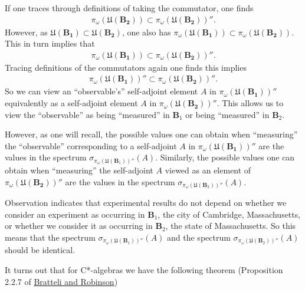 If one traces through definitions of taking the commutator, one finds
\begin{align}
    \pi_{\omega}(\mathfrak{U}(\mathbf{B_2})) \subset \pi_{\omega}(\mathfrak{U}(\mathbf{B_2}))''.
\end{align}
However, as $\mathfrak{U}(\mathbf{B_1}) \subset \mathfrak{U}(\mathbf{B_2})$, one also has $\pi_{\omega}(\mathfrak{U}(\mathbf{B_1})) \subset \pi_{\omega}(\mathfrak{U}(\mathbf{B_2}))$. This in turn implies that
\begin{align}
    \pi_{\omega}(\mathfrak{U}(\mathbf{B_1})) \subset \pi_{\omega}(\mathfrak{U}(\mathbf{B_2}))''.
\end{align}
Tracing definitions of the commutators again one finds this implies
\begin{align}
    \pi_{\omega}(\mathfrak{U}(\mathbf{B_1}))'' \subset \pi_{\omega}(\mathfrak{U}(\mathbf{B_2}))''.
\end{align}
So we can view an ``observable's'' self-adjoint element $A$ in $\pi_{\omega}(\mathfrak{U}(\mathbf{B_1}))''$ equivalently as a self-adjoint element $A$ in $\pi_{\omega}(\mathfrak{U}(\mathbf{B_2}))''$. This allows us to view the ``observable'' as being ``measured'' in $\mathbf{B}_1$ or being ``measured'' in $\mathbf{B}_2$.

However, as one will recall, the possible values one can obtain when ``measuring'' the ``observable'' corresponding to a self-adjoint $A$ in $\pi_{\omega}(\mathfrak{U}(\mathbf{B_1}))''$ are the values in the spectrum $\sigma_{\pi_\omega(\mathfrak{U}(\mathbf{B}_1))''}(A)$. Similarly, the possible values one can obtain when ``measuring'' the self-adjoint $A$ viewed as an element of $\pi_{\omega}(\mathfrak{U}(\mathbf{B_2}))''$ are the values in the spectrum $\sigma_{\pi_\omega(\mathfrak{U}(\mathbf{B}_2))''}(A)$.

Observation indicates that experimental results do not depend on whether we consider an experiment as occurring in $\mathbf{B}_1$, the city of Cambridge, Massachusetts, or whether we consider it as occurring in $\mathbf{B}_2$, the state of Massachusetts. So this means that the spectrum $\sigma_{\pi_\omega(\mathfrak{U}(\mathbf{B}_1))''}(A)$ and the spectrum $\sigma_{\pi_\omega(\mathfrak{U}(\mathbf{B}_2))''}(A)$ should be identical.

It turns out that for C*-algebras we have the following theorem (Proposition 2.2.7 of \href{https://doi.org/10.1007/978-3-662-02520-8}{Bratteli and Robinson})

